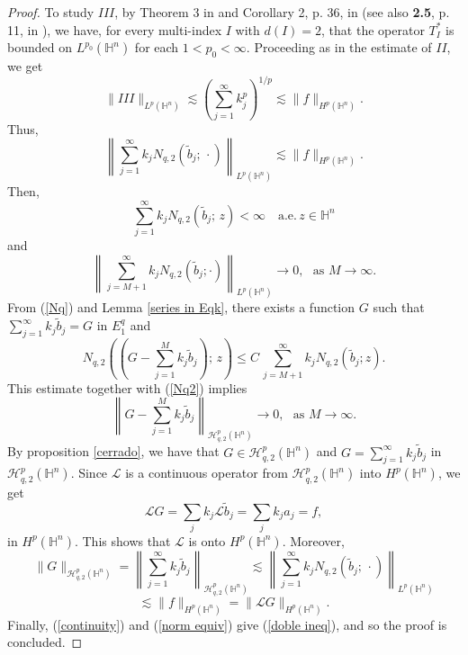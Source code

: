 \documentclass[reqno,10pt]{article}
\theoremstyle{definition}
\numberwithin{equation}{section}
\numberwithin{theorem}{section}
\begin{document}
\begin{proof}
To study $III$, by Theorem 3 in \cite{Folland} and Corollary 2, p. 36, in \cite{Elias} (see also \textbf{2.5}, p. 11, in \cite{Elias}), 
we have, for every multi-index $I$ with $d(I) = 2$, that the operator $T_{I}^{*}$ is bounded on $L^{p_0}(\mathbb{H}^n)$ for each 
$1 < p_0 < \infty$. Proceeding as in the estimate of $II$, we get
\[
\| III\|_{L^{p}(\mathbb{H}^n)} \lesssim \left( \sum_{j=1}^{\infty} k_{j}^{p} \right)^{1/p} \lesssim \|f \|_{H^{p}(\mathbb{H}^{n})}.
\]
Thus,
\[
\left\| \sum_{j=1}^{\infty} k_j N_{q, 2} \left( \widetilde{b}_j; \, \cdot \right) \right\|_{L^{p}(\mathbb{H}^n)} \lesssim 
\|f \|_{{H^{p}(\mathbb{H}^n)}}.
\]
Then,
\begin{equation}
\sum_{j=1}^{\infty} k_j N_{q, 2} \left( \widetilde{b}_j; \, z \right) < \infty \,\,\,\,\,\, \text{a.e.} \, z \in \mathbb{H}^{n} \label{Nq}
\end{equation}
and
\begin{equation}
\left\| \sum_{j=M+1}^{\infty} k_j N_{q, 2} \left(\widetilde{b}_j; \cdot \right) \right\|_{L^{p}(\mathbb{H}^n)} \rightarrow 0, \,\,\,\, 
\text{as} \,\,  M \rightarrow \infty  \label{Nq2}.
\end{equation}
From (\ref{Nq}) and Lemma \ref{series in Eqk}, there exists a function $G$ such that $\sum_{j=1}^{\infty} k_j \widetilde{b}_j = G$ 
in $E^{q}_{1}$ and
\[
N_{q, 2} \left( \left(G - \sum_{j=1}^{M} k_j \widetilde{b}_j \right) ; \, z \right) \leq 
C \, \sum_{j=M+1}^{\infty} k_j N_{q, 2}(\widetilde{b}_j; z).
\]
This estimate together with (\ref{Nq2}) implies
\[
\left\| G - \sum_{j=1}^{M} k_j \widetilde{b}_j \right\|_{\mathcal{H}^{p}_{q,2}(\mathbb{H}^n)} \rightarrow 0, \,\,\,\, 
\text{as} \,\,  M \rightarrow \infty.
\]
By proposition \ref{cerrado}, we have that $G \in \mathcal{H}^{p}_{q,2}(\mathbb{H}^{n})$ and $G = \sum_{j=1}^{\infty} k_j \widetilde{b}_j$ in 
$\mathcal{H}^{p}_{q,2}(\mathbb{H}^{n})$. Since $\mathcal{L}$ is a continuous operator from $\mathcal{H}^{p}_{q,2}(\mathbb{H}^{n})$ into 
$H^{p}(\mathbb{H}^{n})$, we get
\[
\mathcal{L}G = \sum_j k_j \mathcal{L} \widetilde{b}_j = \sum_j k_j a_j = f,
\]
in $H^{p}(\mathbb{H}^{n})$. This shows that $\mathcal{L}$ is onto $H^{p}(\mathbb{H}^{n})$. Moreover,
\begin{equation} \label{norm equiv}
\| G\|_{\mathcal{H}^{p}_{q,2}(\mathbb{H}^n)} = 
\left\| \sum_{j=1}^{\infty} k_j \widetilde{b}_j \right\|_{\mathcal{H}^{p}_{q,2}(\mathbb{H}^n)} \lesssim 
\left\| \sum_{j=1}^{\infty} k_j N_{q, 2}(\widetilde{b}_j; \, \cdot) \right\|_{L^{p}(\mathbb{H}^n)}
\end{equation}
\[
\lesssim \|f \|_{H^{p}(\mathbb{H}^n)} 
= \| \mathcal{L} G \|_{H^{p}(\mathbb{H}^n)}.
\]
Finally, (\ref{continuity}) and (\ref{norm equiv}) give (\ref{doble ineq}), and so the proof is concluded.
\end{proof}
\end{document}
